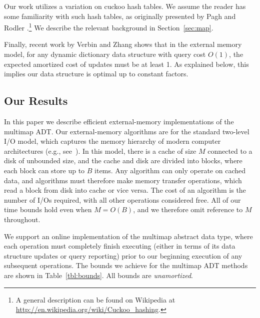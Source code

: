 \documentclass[11pt,letterpaper]{article}
\begin{document}
Our work utilizes a variation on cuckoo hash tables.  We assume the reader
has some familiarity with such hash tables, as originally presented by Pagh
and Rodler \cite{pr-ch-04}.\footnote{A general description can be found on Wikipedia
at \url{http://en.wikipedia.org/wiki/Cuckoo_hashing}.}  
We describe the relevant
background in Section~\ref{sec:map}.  

Finally, recent work by Verbin and Zhang \cite{vz} shows that in the external memory model,
for any dynamic dictionary data structure with query cost $O(1)$, the expected amortized cost of updates 
must be at least 1. As explained below, this implies our data structure is optimal up to constant factors. 
 
\subsection{Our Results}

In this paper we describe efficient external-memory
implementations of the multimap ADT.  Our external-memory algorithms are
for the standard two-level I/O model, which captures the memory hierarchy of
modern computer architectures (e.g.,
see~\cite{av-iocsr-88,DBLP:reference/algo/Vitter08}). In this model, there is a cache of size $M$ connected to a disk of
unbounded size, and the cache and disk are divided into blocks,
where each block can store up to $B$ items. Any algorithm can only operate on cached data,
and algorithms must therefore make memory transfer operations,
which read a block from disk into cache or vice versa.
The cost of an algorithm is the number of I/Os required,
with all other operations considered free.
All of our time bounds hold even when $M=O(B)$,
and we therefore omit reference to $M$
throughout. 

We support an online implementation of the multimap
abstract data type, where each operation must 
completely finish executing (either in terms of its data structure updates or
query reporting) prior to our beginning execution of any subsequent
operations.
The bounds we achieve for the multimap ADT methods are shown in
Table~\ref{tbl:bounds}. All bounds are \emph{unamortized}. 
\end{document}
